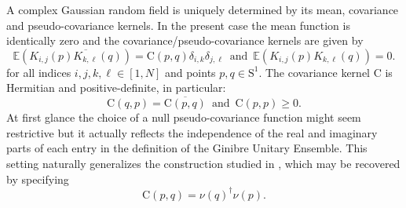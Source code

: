 \documentclass[pdflatex,sn-mathphys-num]{sn-jnl}
\theoremstyle{thmstyleone}
\numberwithin{equation}{section}
\newcommand{\Cc}{\mathrm{C}}
\begin{document}
A complex Gaussian random field is uniquely determined by its mean, covariance and pseudo-covariance kernels. In the present case the mean function is identically zero and the covariance/pseudo-covariance kernels are given by
\begin{equation}\label{matrixgrf}
    \mathbb{E}\left(K_{i,j}\left( p \right)\overline{K_{k,\ell}}\left( q \right)  \right)=\Cc(p,q)\delta_{i,k}\delta_{j,\ell}\,\text{ and }\,\mathbb{E}\left( K_{i,j}\left( p \right)K_{k,\ell}\left( q \right) \right)=0.
\end{equation}
for all indices $i,j,k,\ell\in\left[ 1,N \right]$ and points $p,q\in\mathrm{S}^{1}$.
The covariance kernel $\Cc$ is Hermitian and positive-definite, in particular:
\begin{equation}
    \Cc(q,p)=\overline{\Cc(p,q)}\,\text{ and }\,\Cc(p,p)\geq 0.
\end{equation}
At first glance the choice of a null pseudo-covariance function might seem restrictive but it actually reflects the independence of the real and imaginary parts of each entry in the definition of the Ginibre Unitary Ensemble. This setting naturally generalizes the construction studied in \cite{hahnWindingNumberStatistics2023,hahnUniversalCorrelations2024}, which may be recovered by specifying
\begin{equation}
    \Cc(p,q)=\nu(q)^{\dagger}\nu(p).
\end{equation}
\end{document}
